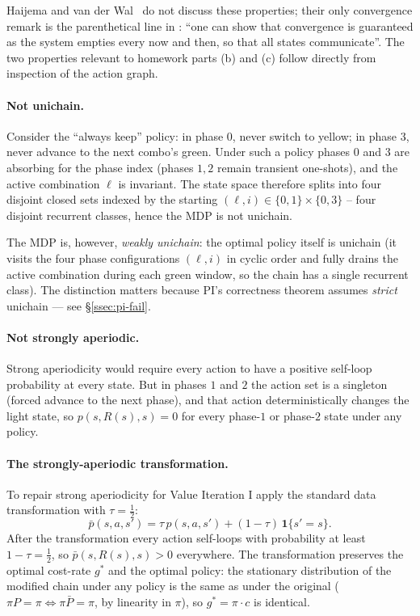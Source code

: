 \documentclass[11pt,a4paper]{article}
\begin{document}
Haijema and van der Wal~\cite{haijema2008} do not discuss these
properties; their only convergence remark is the parenthetical line
in \cite[\S 3.6]{haijema2008}: ``one can show that convergence is
guaranteed as the system empties every now and then, so that all
states communicate''. The two properties relevant to homework parts
(b) and (c) follow directly from inspection of the action graph.

\paragraph{Not unichain.}
Consider the ``always keep'' policy: in phase $0$, never switch to
yellow; in phase $3$, never advance to the next combo's green.
Under such a policy phases $0$ and $3$ are absorbing for the phase
index (phases $1, 2$ remain transient one-shots), and the active
combination $\ell$ is invariant. The state space therefore splits
into four disjoint closed sets indexed by the starting
$(\ell, i) \in \{0, 1\} \times \{0, 3\}$ -- four disjoint recurrent
classes, hence the MDP is not unichain.

The MDP is, however, \emph{weakly unichain}: the optimal policy itself
is unichain
(it visits the four phase configurations $(\ell, i)$ in cyclic order
and fully drains the active combination during each green window, so
the chain has a single recurrent class). The distinction matters
because PI's correctness theorem assumes \emph{strict} unichain ---
see \S\ref{ssec:pi-fail}.

\paragraph{Not strongly aperiodic.}
Strong aperiodicity would require every action to have a positive
self-loop probability at every state. But in phases $1$ and $2$ the
action set is a singleton (forced advance to the next phase), and
that action deterministically changes the light state, so
$p(s, R(s), s) = 0$ for every phase-$1$ or phase-$2$ state under any
policy.

\paragraph{The strongly-aperiodic transformation.}
To repair strong aperiodicity for Value Iteration I apply the standard
data transformation with $\tau = \tfrac{1}{2}$:
\begin{equation}
    \bar{p}(s, a, s')
    = \tau \, p(s, a, s')
    + (1 - \tau) \, \mathbf{1}\{s' = s\}.
\end{equation}
After the transformation every action self-loops with probability at
least $1 - \tau = \tfrac{1}{2}$, so $\bar{p}(s, R(s), s) > 0$
everywhere. The transformation preserves the optimal cost-rate $g^*$
and the optimal policy: the stationary distribution of the modified
chain under any policy is the same as under the original
($\pi P = \pi \Leftrightarrow \pi \bar{P} = \pi$, by linearity in
$\pi$), so $g^* = \pi \cdot c$ is identical.
\end{document}

